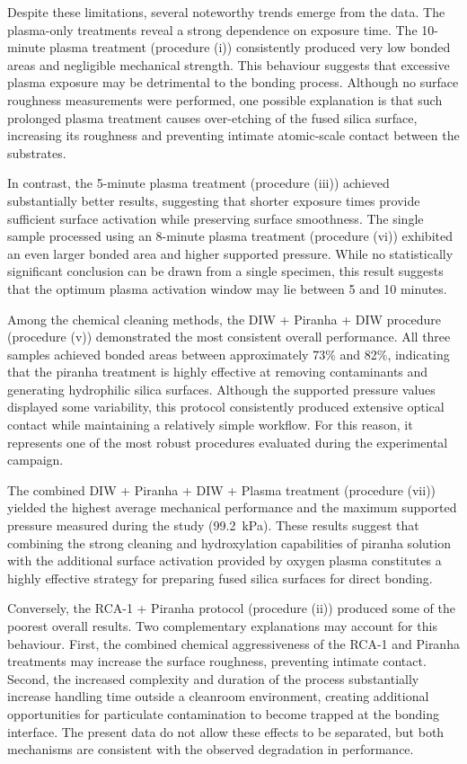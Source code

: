 Despite these limitations, several noteworthy trends emerge from the data.
The plasma-only treatments reveal a strong dependence on exposure time. The
10-minute plasma treatment (procedure (i)) consistently produced very low
bonded areas and negligible mechanical strength. This behaviour suggests
that excessive plasma exposure may be detrimental to the bonding process.
Although no surface roughness measurements were performed, one possible
explanation is that such prolonged plasma treatment causes over-etching of the
fused silica surface, increasing its roughness and preventing intimate
atomic-scale contact between the substrates.

In contrast, the 5-minute plasma treatment (procedure (iii)) achieved
substantially better results, suggesting that shorter exposure times provide
sufficient surface activation while preserving surface smoothness. The
single sample processed using an 8-minute plasma treatment (procedure (vi))
exhibited an even larger bonded area and higher supported pressure. While no
statistically significant conclusion can be drawn from a single specimen,
this result suggests that the optimum plasma activation window may lie
between 5 and 10 minutes.

Among the chemical cleaning methods, the DIW + Piranha + DIW procedure
(procedure (v)) demonstrated the most consistent overall performance. All
three samples achieved bonded areas between approximately 73$\%$ and 82$\%$,
indicating that the piranha treatment is highly effective at removing
contaminants and generating hydrophilic silica surfaces. Although the
supported pressure values displayed some variability, this protocol
consistently produced extensive optical contact while maintaining a
relatively simple workflow. For this reason, it represents one of the most
robust procedures evaluated during the experimental campaign.

The combined DIW + Piranha + DIW + Plasma treatment (procedure (vii))
yielded the highest average mechanical performance and the maximum supported
pressure measured during the study (\SI{99.2}{\kilo\pascal}). These results
suggest that combining the strong cleaning and hydroxylation capabilities of
piranha solution with the additional surface activation provided by oxygen
plasma constitutes a highly effective strategy for preparing fused silica
surfaces for direct bonding.

Conversely, the RCA-1 + Piranha protocol (procedure (ii)) produced some of
the poorest overall results. Two complementary explanations may account for
this behaviour. First, the combined chemical aggressiveness of the RCA-1 and
Piranha treatments may increase the surface roughness, preventing
intimate contact. Second, the increased complexity and duration of the
process substantially increase handling time outside a cleanroom
environment, creating additional opportunities for particulate
contamination to become trapped at the bonding interface. The present data
do not allow these effects to be separated, but both mechanisms are
consistent with the observed degradation in performance.


